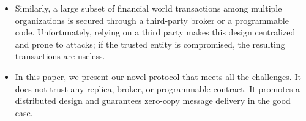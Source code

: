 \begin{itemize}[wide]
\item Similarly, a large subset of financial world transactions among multiple organizations 
is secured through a third-party broker or a programmable code. 
Unfortunately, relying on a third party makes this design centralized and prone to attacks; 
if the trusted entity is compromised, the resulting transactions are useless. 


\item In this paper, we present our novel \Scrooge{} protocol that meets all the challenges.
It does not trust any replica, broker, or programmable contract. 
It promotes a distributed design and guarantees zero-copy message delivery in the good case.


\end{itemize}